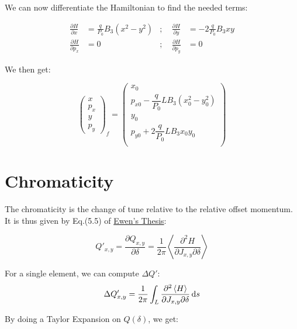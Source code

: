 We can now differentiate the Hamiltonian to find the needed terms:

\begin{equation}
\begin{aligned}
\frac{\partial H}{\partial x} &= \frac{q}{P_0} B_3 (x^2 - y^2) &; \quad \frac{\partial H}{\partial y} &= -2 \frac{q}{P_0} B_3 x y \\
\frac{\partial H}{\partial p_x} &= 0                 &; \quad \frac{\partial H}{\partial p_y} &= 0
\end{aligned}
\end{equation}

We then get:

\begin{equation}
\begin{pmatrix}
x \\ p_x \\ y \\ p_y
\end{pmatrix}_f
=
\begin{pmatrix}
x_0 \\
p_{x0} - \dfrac{q}{P_0} L B_3 (x_0^2 - y_0^2) \\
y_0 \\
p_{y0} + 2\dfrac{q}{P_0} L B_3 x_0 y_0 \\
\end{pmatrix}
\end{equation}

\newpage

\hypertarget{chromaticity}{%
\section{Chromaticity}\label{chromaticity}}

The chromaticity is the change of tune relative to the relative offset
momentum. It is thus given by Eq.(5.5) of
\href{https://cds.cern.ch/record/1951379/files/Thesis-2014-Ewen}{Ewen's
Thesis}:

\[Q'_{x,y} = \frac{\partial Q_{x,y}}{\partial \delta} = \frac{1}{2\pi}\left< \frac{\partial^2 H}{\partial J_{x,y}\partial \delta}\right>\]

For a single element, we can compute $\Delta Q'$:
\begin{equation}\Delta Q_{x,y}' = \frac{1}{2\pi} \int_L \frac{\partial^2 \left< H \right>}{\partial J_{x,y} \partial \delta} \mathop{}\!\mathrm{d} s\label{eq:chroma}\end{equation}

By doing a Taylor Expansion on \(Q(\delta)\), we get:

